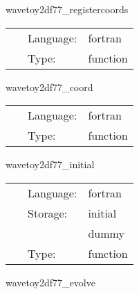 \hspace{5mm} wavetoy2df77\_registercoords 

\hspace{5mm}{\it register wavetoy2df77 coordinates } 


\hspace{5mm}

 \begin{tabular*}{160mm}{cll} 
~ & Language:  & fortran \\ 
~ & Type:  & function \\ 
\end{tabular*} 


\vspace{5mm}


\hspace{5mm} wavetoy2df77\_coord 

\hspace{5mm}{\it set up 2d coordinates } 


\hspace{5mm}

 \begin{tabular*}{160mm}{cll} 
~ & Language:  & fortran \\ 
~ & Type:  & function \\ 
\end{tabular*} 


\vspace{5mm}


\hspace{5mm} wavetoy2df77\_initial 

\hspace{5mm}{\it initial data for 2d wave equation } 


\hspace{5mm}

 \begin{tabular*}{160mm}{cll} 
~ & Language:  & fortran \\ 
~ & Storage:  & initial \\ 
~& ~ &dummy\\ 
~ & Type:  & function \\ 
\end{tabular*} 


\vspace{5mm}


\hspace{5mm} wavetoy2df77\_evolve 

